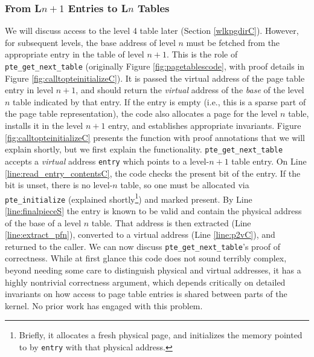\subsubsection{From L$n+1$ Entries to L$n$ Tables}
We will discuss access to the level 4 table later (Section \ref{wlkpgdirC}). However, for subsequent levels, the base address of level $n$ must be
fetched from the appropriate entry in the table of level $n+1$.
This is the role of \lstinline|pte_get_next_table| (originally Figure \ref{fig:pagetablescode}, with proof details in Figure \ref{fig:calltopteinitializeC}).
It is passed the virtual address of the page table entry in level $n+1$, and should return the \emph{virtual} 
address of the \emph{base} of the level $n$ table
indicated by that entry.
If the entry is empty (i.e., this is a sparse part of the page table representation),
the code also allocates a page for the level $n$ table, installs it in the level $n+1$ entry, and establishes appropriate invariants.
Figure \ref{fig:calltopteinitializeC} presents the function with proof annotations that we will explain shortly, but we first explain the functionality.
\lstinline|pte_get_next_table| accepts a \emph{virtual} address \lstinline|entry| which points to a level-$n+1$
table entry. On Line \ref{line:read_entry_contentsC}, the code checks the present bit of the entry.
If the bit is unset, there is no level-$n$ table, so one must be allocated via \lstinline|pte_initialize| (explained shortly\footnote{
  Briefly, it allocates a fresh physical page, and initializes the memory pointed to by \lstinline|entry| with that physical address.
}) and marked present.
By Line \ref{line:finalpieceS} the entry is known to be valid and contain the physical address of
the base of a level $n$ table. That address is then extracted (Line \ref{line:extract_pfn}),
converted to a virtual address (Line \ref{line:p2vC}), and returned to the caller.
We can now discuss \lstinline|pte_get_next_table|'s proof of correctness.
While at first glance this code does not sound terribly complex, beyond needing some care to distinguish physical and virtual addresses,
it has a highly nontrivial correctness argument, which depends critically on detailed invariants on how access to page table
entries is shared between parts of the kernel. No prior work has engaged with this problem.


